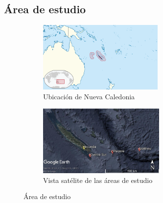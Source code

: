 \documentclass[a4paper, 11pt]{article}
\begin{document}
\subsection{Área de estudio}
\begin{figure}[b]
	
	\begin{subfigure}[b]{0.5\textwidth}
		\includegraphics[width=\textwidth, height=35mm]{Mapa_Nueva_Caledonia}
		\caption{Ubicación de Nueva Caledonia}
		\label{fig:1.a}	
	\end{subfigure}
	\begin{subfigure}[b]{0.5\textwidth}
		\includegraphics[width=\textwidth, height=35mm]{Mapa_area_de_muestreo}
		\caption{Vista satélite de las áreas de estudio}
		\label{fig:1.b}	
	\end{subfigure}
	\caption{Área de estudio}
\end{figure}
\end{document}
